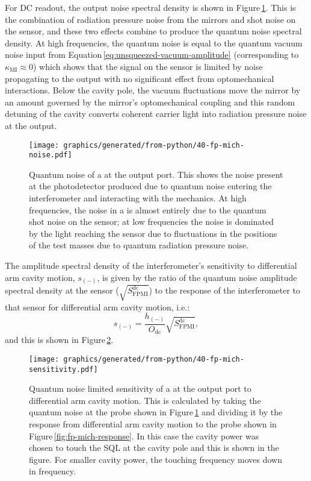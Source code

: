 For \gls{DC} readout, the output noise spectral density is shown in Figure\,\ref{fig:fp-mich-noise}. This is the combination of radiation pressure noise from the mirrors and shot noise on the sensor, and these two effects combine to produce the quantum noise spectral density. At high frequencies, the quantum noise is equal to the quantum vacuum noise input from Equation\,\ref{eq:unsqueezed-vacuum-amplitude} (corresponding to $\kappa_{\text{MI}} \approx 0$) which shows that the signal on the sensor is limited by noise propagating to the output with no significant effect from optomechanical interactions. Below the cavity pole, the vacuum fluctuations move the mirror by an amount governed by the mirror's optomechanical coupling and this random detuning of the cavity converts coherent carrier light into radiation pressure noise at the output.

\begin{figure}
  \centering
  \texttt{[image: graphics/generated/from-python/40-fp-mich-noise.pdf]}
  \caption[Quantum noise of a \FPMI{} at the output port]{\label{fig:fp-mich-noise}Quantum noise of a \FPMI{} at the output port. This shows the noise present at the photodetector produced due to quantum noise entering the interferometer and interacting with the mechanics. At high frequencies, the noise in a \MI{} is almost entirely due to the quantum shot noise on the sensor; at low frequencies the noise is dominated by the light reaching the sensor due to fluctuations in the positions of the test masses due to quantum radiation pressure noise.}
\end{figure}

The amplitude spectral density of the interferometer's sensitivity to differential arm cavity motion, $s_{\left( - \right)}$, is given by the ratio of the quantum noise amplitude spectral density at the sensor ($\sqrt{S_{\text{FPMI}}^{\text{dc}}}$) to the response of the interferometer to that sensor for differential arm cavity motion, i.e.:
\begin{equation}
  s_{\left( - \right)} = \frac{h_{\left( - \right)}}{O_{\text{dc}}} \sqrt{S_{\text{FPMI}}^{\text{dc}}},
\end{equation}
and this is shown in Figure\,\ref{fig:fp-mich-sensitivity}.

\begin{figure}
  \centering
  \texttt{[image: graphics/generated/from-python/40-fp-mich-sensitivity.pdf]}
  \caption[Sensitivity of a \FPMI{} at the output port to differential arm cavity motion]{\label{fig:fp-mich-sensitivity}Quantum noise limited sensitivity of a \FPMI{} at the output port to differential arm cavity motion. This is calculated by taking the quantum noise at the probe shown in Figure\,\ref{fig:fp-mich-noise} and dividing it by the response from differential arm cavity motion to the probe shown in Figure\,\ref{fig:fp-mich-response}. In this case the cavity power was chosen to touch the \gls{SQL} at the cavity pole and this is shown in the figure. For smaller cavity power, the touching frequency moves down in frequency.}
\end{figure}

